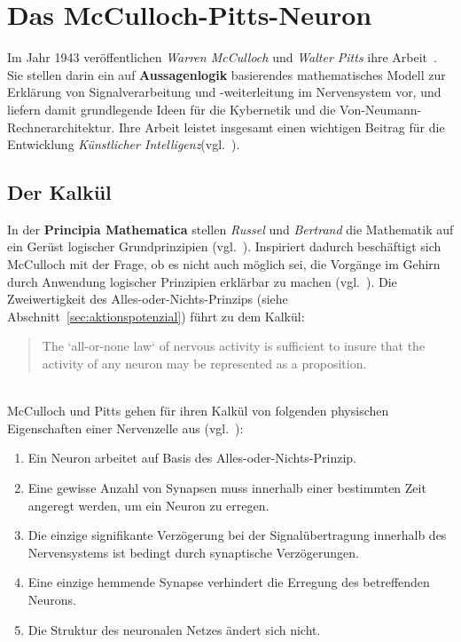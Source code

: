 \section{Das McCulloch-Pitts-Neuron}\label{sec:mcpneuron}

Im Jahr 1943 veröffentlichen \textit{Warren McCulloch} und \textit{Walter Pitts} ihre Arbeit~\cite{MP43}.
Sie stellen darin ein auf \textbf{Aussagenlogik} basierendes mathematisches Modell zur Erklärung von Signalverarbeitung und  -weiterleitung im Nervensystem vor, und liefern damit grundlegende Ideen für die Kybernetik und die Von-Neumann-Rechnerarchitektur.
Ihre Arbeit leistet insgesamt einen wichtigen Beitrag für die Entwicklung \textit{Künstlicher Intelligenz}(vgl.~\cite[1]{Arb19}).


\subsection{Der Kalkül}\label{sec:mcpkalkül}

In der \textbf{Principia Mathematica} stellen \textit{Russel} und \textit{Bertrand} die Mathematik auf ein Gerüst logischer Grundprinzipien (vgl.~\cite[225]{She26}). Inspiriert dadurch beschäftigt sich McCulloch mit der Frage, ob es nicht auch möglich sei, die Vorgänge im Gehirn durch Anwendung logischer Prinzipien erklärbar zu machen (vgl.~\cite[4]{Arb19}). Die Zweiwertigkeit des Alles-oder-Nichts-Prinzips (siehe Abschnitt~\ref{sec:aktionspotenzial}) führt zu dem Kalkül:

\blockquote[{\cite[100]{MP43}}]{
    The `all-or-none law` of nervous activity is sufficient to insure that the activity of any neuron may be represented as a proposition.
}\\

McCulloch und Pitts gehen für ihren Kalkül von folgenden physischen Eigenschaften einer Nervenzelle aus (vgl.~\cite[101]{MP43}):


\begin{enumerate}
    \item Ein Neuron arbeitet auf Basis des Alles-oder-Nichts-Prinzip.
    \item Eine gewisse Anzahl von Synapsen muss innerhalb einer bestimmten Zeit angeregt werden, um ein Neuron zu erregen.
    \item Die einzige signifikante Verzögerung bei der Signalübertragung innerhalb des Nervensystems ist bedingt durch synaptische Verzögerungen.
    \item Eine einzige hemmende Synapse verhindert die Erregung des betreffenden Neurons.
    \item Die Struktur des neuronalen Netzes ändert sich nicht.
\end{enumerate}


